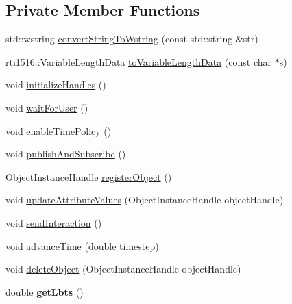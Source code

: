 \subsection*{Private Member Functions}
\begin{DoxyCompactItemize}
\item 
std::wstring \hyperlink{class_example_c_p_p_federate_af5e9565fdea92cdee1cd27bbe7ad74ce}{convertStringToWstring} (const std::string \&str)
\item 
rti1516::VariableLengthData \hyperlink{class_example_c_p_p_federate_aaf7e26b8a397f6d87ae2c27326cde893}{toVariableLengthData} (const char $\ast$s)
\item 
void \hyperlink{class_example_c_p_p_federate_a1fde2254c348389efc4cd894e03fce87}{initializeHandles} ()
\item 
void \hyperlink{class_example_c_p_p_federate_a8a6fa5956cc241097e15385ca2da433f}{waitForUser} ()
\item 
void \hyperlink{class_example_c_p_p_federate_a5184192fe0adb7b0259151dfbd8245e3}{enableTimePolicy} ()
\item 
void \hyperlink{class_example_c_p_p_federate_a57413d733e33b493abd929a7e46ff3dc}{publishAndSubscribe} ()
\item 
ObjectInstanceHandle \hyperlink{class_example_c_p_p_federate_afe34dcca7757b66ebbf9d2dea37e3440}{registerObject} ()
\item 
void \hyperlink{class_example_c_p_p_federate_ad2d6193d942e59a2cf5ee05531962967}{updateAttributeValues} (ObjectInstanceHandle objectHandle)
\item 
void \hyperlink{class_example_c_p_p_federate_a60bb15d2fc7a3437c13e8d8e09df8a1a}{sendInteraction} ()
\item 
void \hyperlink{class_example_c_p_p_federate_adfbfb26a2eeac388c3f5c2f68844ca13}{advanceTime} (double timestep)
\item 
void \hyperlink{class_example_c_p_p_federate_a7b6dcb57aea95b30d384187b551e03ae}{deleteObject} (ObjectInstanceHandle objectHandle)
\item 
\hypertarget{class_example_c_p_p_federate_a04d499d8cab5b555440199bc12524d65}{
double {\bfseries getLbts} ()}
\label{class_example_c_p_p_federate_a04d499d8cab5b555440199bc12524d65}

\end{DoxyCompactItemize}
